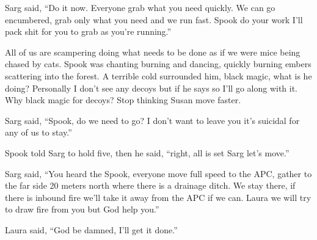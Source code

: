 Sarg said, ``Do it now. Everyone grab what you need quickly. We can go encumbered, grab only what you need and we run fast. Spook do your work I'll pack shit for you to grab as you're running.''

All of us are scampering doing what needs to be done as if we were mice being chased by cats. Spook was chanting burning and dancing, quickly burning embers scattering into the forest. A terrible cold surrounded him, black magic, what is he doing? Personally I don't see any decoys but if he says so I'll go along with it. Why black magic for decoys? Stop thinking Susan move faster.

Sarg said, ``Spook, do we need to go? I don't want to leave you it's suicidal for any of us to stay.''

Spook told Sarg to hold five, then he said, ``right, all is set Sarg let's move.''

Sarg said, ``You heard the Spook, everyone move full speed to the APC, gather to the far side 20 meters north where there is a drainage ditch. We stay there, if there is inbound fire we'll take it away from the APC if we can. Laura we will try to draw fire from you but God help you.''

Laura said, ``God be damned, I'll get it done.''

